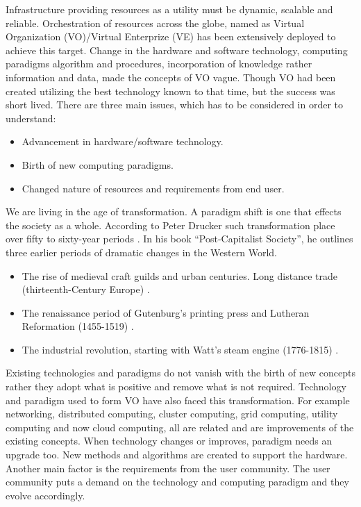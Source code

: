\documentclass[]{article}
\begin{document}
Infrastructure providing resources as a utility must be dynamic, scalable and reliable. Orchestration of resources across the globe, named as Virtual Organization (VO)/Virtual Enterprize (VE) has been extensively deployed to achieve this target. Change in the hardware and software technology, computing paradigms algorithm and procedures, incorporation of knowledge rather information and data, made the concepts of VO vague. Though VO had been created utilizing the best technology known to that time, but the success was short lived. There are three main issues, which has to be considered in order to understand:
\begin{itemize}
\item{ Advancement in hardware/software technology.}
\item{ Birth of new computing paradigms.}
\item{ Changed nature of resources and requirements from end user.}
\end{itemize}
 We are living in the age of transformation. A paradigm shift is one that effects the society as a whole. According to Peter Drucker such transformation place over fifty to sixty-year periods \cite{Drucker1994}. In his book ``Post-Capitalist Society'', he outlines three earlier periods of dramatic changes in the Western World.
\begin{itemize}
\item The rise of medieval craft guilds and urban centuries. Long distance trade (thirteenth-Century Europe) \cite{Drucker1994}.
\item The renaissance period of Gutenburg's printing press and Lutheran Reformation (1455-1519) \cite{Drucker1994}.
\item The industrial revolution, starting with Watt's steam engine (1776-1815) \cite{Drucker1994}.
\end{itemize}

Existing technologies and paradigms do not vanish with the birth of new concepts rather they adopt what is positive and remove what is not required. Technology and paradigm used to form VO have also faced this transformation. For example networking, distributed computing, cluster computing, grid computing, utility computing and now cloud computing, all are related and are improvements of the existing concepts. When technology changes or improves, paradigm needs an upgrade too. New methods and algorithms are created to support the hardware. Another main factor is the requirements from the user community. The user community puts a demand on the technology and computing paradigm and they evolve accordingly.
\end{document}
